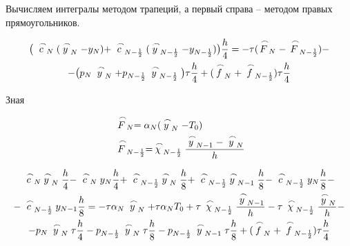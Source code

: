 \documentclass[a4paper,14pt]{extreport} %
\begin{document}
\begin{enumerate}
Вычисляем интегралы методом трапеций, а первый справа -- методом правых прямоугольников. 

\begin{multline*}
\big(\buildrel\,\,\frown\over{c}_{N}(\buildrel\,\,\frown\over{y}_N-y_N)+\buildrel\,\,\frown\over{c}_{N-\frac{1}{2}}(\buildrel\,\,\frown\over{y}_{N-\frac{1}{2}}-y_{N-\frac{1}{2}})\big)\frac{h}{4}=-\tau(\buildrel\,\,\frown\over{F}_N-\buildrel\,\,\frown\over{F}_{N-\frac{1}{2}})-\\
-\big(p_N\buildrel\,\,\frown\over{y}_N+p_{N-\frac{1}{2}}\buildrel\,\,\frown\over{y}_{N-\frac{1}{2}}\big)\tau\frac{h}{4} +(\buildrel\,\,\frown\over{f}_N+\buildrel\,\,\frown\over{f}_{N-\frac{1}{2}})\tau \frac{h}{4}
\end{multline*}

Зная

\begin{equation}
\begin{aligned}
&\buildrel\,\,\frown\over{F}_N=\alpha_N(\buildrel\,\,\frown\over{y}_N-T_0)\\
&\buildrel\,\,\frown\over{F}_{N-\frac{1}{2}}=\buildrel\,\,\frown\over{\chi}_{N-\frac{1}{2}}\frac{\buildrel\,\,\frown\over{y}_{N-1}-\buildrel\,\,\frown\over{y}_N}{h}\\
\end{aligned}
\end{equation}

\begin{multline*}
\buildrel\,\,\frown\over{c}_{N}\buildrel\,\,\frown\over{y}_N\frac{h}{4}-\buildrel\,\,\frown\over{c}_{N}y_N\frac{h}{4}+\buildrel\,\,\frown\over{c}_{N-\frac{1}{2}}\buildrel\,\,\frown\over{y}_{N}\frac{h}{8}+\buildrel\,\,\frown\over{c}_{N-\frac{1}{2}}\buildrel\,\,\frown\over{y}_{N-1}\frac{h}{8}-\buildrel\,\,\frown\over{c}_{N-\frac{1}{2}}{y}_{N}\frac{h}{8}-\\
-\buildrel\,\,\frown\over{c}_{N-\frac{1}{2}}{y}_{N-1}\frac{h}{8}=-\tau\alpha_N\buildrel\,\,\frown\over{y}_N+\tau\alpha_NT_0+\tau\buildrel\,\,\frown\over{\chi}_{N-\frac{1}{2}}\frac{\buildrel\,\,\frown\over{y}_{N-1}}{h}-\tau\buildrel\,\,\frown\over{\chi}_{N-\frac{1}{2}}\frac{\buildrel\,\,\frown\over{y}_{N}}{h}-\\
-p_N\buildrel\,\,\frown\over{y}_N\tau\frac{h}{4}-p_{N-\frac{1}{2}}\buildrel\,\,\frown\over{y}_{N}\tau\frac{h}{8}-p_{N-\frac{1}{2}}\buildrel\,\,\frown\over{y}_{N-1}\tau\frac{h}{8}  +(\buildrel\,\,\frown\over{f}_N+\buildrel\,\,\frown\over{f}_{N-\frac{1}{2}})\tau \frac{h}{4}
\end{multline*}


\end{enumerate}
\end{document}
